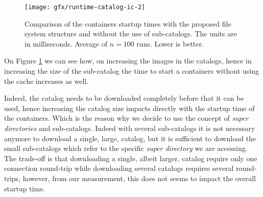 
\begin{figure}[h]{}
    \texttt{[image: gfx/runtime-catalog-ic-2]}
        \caption{Comparison of the containers startup times with the proposed file system structure and without the use of sub-catalogs. The units are in milliseconds. Average of $n=100$ runs. Lower is better.}
        \label{fig:startup-time}
\end{figure}


On Figure \ref{fig:startup-time} we can see how, on increasing the images
in the catalogs, hence in increasing the size of the sub-catalog the
time to start a containers without using the cache increases as well.

Indeed, the catalog needs to be downloaded completely before that it can be
used, hence increasing the catalog size impacts directly with the startup time
of the containers. Which is the reason why we decide to use the concept of
\textit{super directories} and sub-catalogs. Indeed with several sub-catalogs
it is not necessary anymore to download a single, large, catalog, but it is
sufficient to download the small sub-catalogs which refer to the specific
\textit{super directory} we are accessing.  The trade-off is that downloading a
single, albeit larger, catalog require only one connection round-trip while
downloading several catalogs requires several round-trips, however, from our
measurement, this does not seems to impact the overall startup time.

